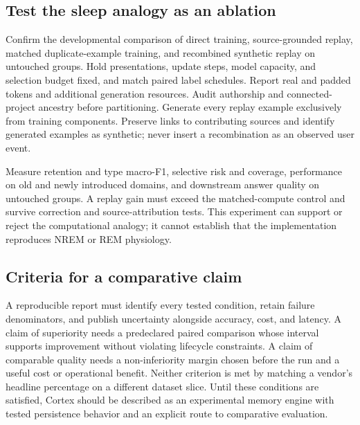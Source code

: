 \subsection{Test the sleep analogy as an ablation}
Confirm the developmental comparison of direct training, source-grounded replay, matched duplicate-example training, and recombined synthetic replay on untouched groups. Hold presentations, update steps, model capacity, and selection budget fixed, and match paired label schedules. Report real and padded tokens and additional generation resources. Audit authorship and connected-project ancestry before partitioning. Generate every replay example exclusively from training components. Preserve links to contributing sources and identify generated examples as synthetic; never insert a recombination as an observed user event.

Measure retention and type macro-F1, selective risk and coverage, performance on old and newly introduced domains, and downstream answer quality on untouched groups. A replay gain must exceed the matched-compute control and survive correction and source-attribution tests. This experiment can support or reject the computational analogy; it cannot establish that the implementation reproduces NREM or REM physiology.

\subsection{Criteria for a comparative claim}
A reproducible report must identify every tested condition, retain failure denominators, and publish uncertainty alongside accuracy, cost, and latency. A claim of superiority needs a predeclared paired comparison whose interval supports improvement without violating lifecycle constraints. A claim of comparable quality needs a non-inferiority margin chosen before the run and a useful cost or operational benefit. Neither criterion is met by matching a vendor's headline percentage on a different dataset slice. Until these conditions are satisfied, Cortex should be described as an experimental memory engine with tested persistence behavior and an explicit route to comparative evaluation.

